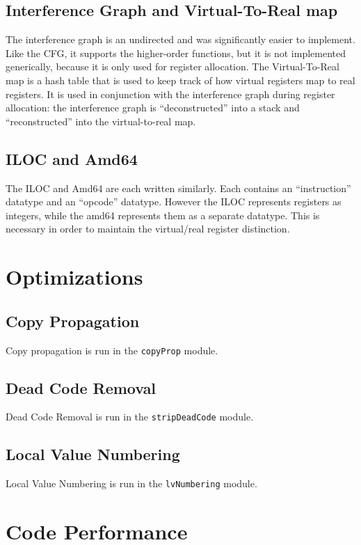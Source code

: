 \documentclass[12pt]{article}
\begin{document}
\subsection*{Interference Graph and Virtual-To-Real map}
The interference graph is an undirected and was significantly easier to implement. Like the CFG, it supports the higher-order functions, but it is not implemented generically, because it is only used for register allocation. The Virtual-To-Real map is a hash table that is used to keep track of how virtual registers map to real registers. It is used in conjunction with the interference graph during register allocation: the interference graph is ``deconstructed'' into a stack and ``reconstructed'' into the virtual-to-real map.

\subsection*{ILOC and Amd64}
The ILOC and Amd64 are each written similarly. Each contains an ``instruction'' datatype and an ``opcode'' datatype. However the ILOC represents registers as integers, while the amd64 represents them as a separate datatype. This is necessary in order to maintain the virtual/real register distinction.

\section*{Optimizations}
\subsection*{Copy Propagation}
Copy propagation is run in the \texttt{copyProp} module.

\subsection*{Dead Code Removal}
Dead Code Removal is run in the \texttt{stripDeadCode} module.

\subsection*{Local Value Numbering}
Local Value Numbering is run in the \texttt{lvNumbering} module.

\section*{Code Performance}
\end{document}
